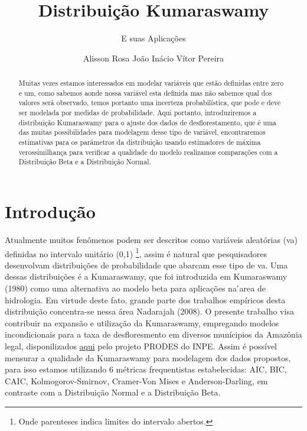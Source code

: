 \documentclass[
]{article}
\title{Distribuição Kumaraswamy}
\subtitle{E suas Aplicações}
\author{Alisson Rosa João Inácio Vítor Pereira}
\date{}
\begin{document}
\maketitle
\begin{abstract}
Muitas vezes estamos interessados em modelar variáveis que estão
definidas entre zero e um, como sabemos aonde nossa variável esta
definida mas não sabemos qual dos valores será observado, temos portanto
uma incerteza probabilística, que pode e deve ser modelada por medidas
de probabilidade. Aqui portanto, introduziremos a distribuição
Kumaraswamy para o ajuste dos dados de desflorestamento, que é uma das
muitas possibilidades para modelagem desse tipo de variável,
encontraremos estimativas para os parâmetros da distribuição usando
estimadores de máxima verossimilhança para verificar a qualidade do
modelo realizamos comparações com a Distribuição Beta e a Distribuição
Normal.
\end{abstract}
\ifdefined\Shaded\renewenvironment{Shaded}{\begin{tcolorbox}[interior hidden, frame hidden, breakable, enhanced, boxrule=0pt, borderline west={3pt}{0pt}{shadecolor}, sharp corners]}{\end{tcolorbox}}\fi

\section{\centering Introdução}

Atualmente muitos fenômenos podem ser descritos como variáveis
aleatórias (va) definidas no intervalo unitário (0,1) \footnote{Onde
  parenteses indica limites do intervalo abertos.}, assim é natural que
pesquisadores desenvolvam distribuições de probabilidade que abarcam
esse tipo de va. Uma dessas distribuições é a Kumaraswamy, que foi
introduzida em Kumaraswamy (1980) como uma alternativa ao modelo beta
para aplicações na ́area de hidrologia. Em virtude deste fato, grande
parte dos trabalhos empíricos desta distribuição concentra-se nessa área
Nadarajah (2008). O presente trabalho visa contribuir na expansão e
utilização da Kumaraswamy, empregando modelos incondicionais para a taxa
de desfloresmento em diversos munícipios da Amazônia legal,
disponilizados
\href{http://www.dpi.inpe.br/prodesdigital/prodesmunicipal.php}{aqui}
pelo projeto PRODES do INPE. Assim é possível mensurar a qualidade da
Kumaraswamy para modelagem dos dados propostos, para isso estamos
utilizando 6 métricas frequentistas estabelecidas: AIC, BIC, CAIC,
Kolmogorov-Smirnov, Cramer-Von Mises e Anderson-Darling, em contraste
com a Distribuição Normal e a Distribuição Beta.
\end{document}
